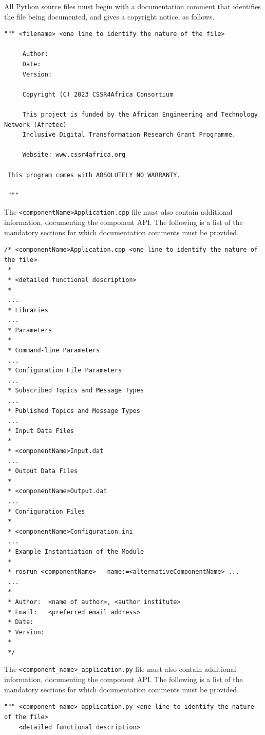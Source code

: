\documentclass{CSSRforAfrica}
\newcommand{\blank}{~\\}
\begin{document}
\begin{appendices}
\newpage
\noindent All Python source files must begin with a documentation comment that identifies the file being documented, and gives a copyright notice, as follows.  
{\small
\begin{verbatim}
""" <filename> <one line to identify the nature of the file>
 
     Author:
     Date:
     Version:
 
     Copyright (C) 2023 CSSR4Africa Consortium
 
     This project is funded by the African Engineering and Technology Network (Afretec) 
     Inclusive Digital Transformation Research Grant Programme. 
  
     Website: www.cssr4africa.org
 
 This program comes with ABSOLUTELY NO WARRANTY.

 """
\end{verbatim}
}


\newpage 
\noindent The {\small \verb+<componentName>Application.cpp+} file must also contain additional information, documenting the component API. The following is a list of the mandatory sections for which documentation comments must be provided.  

{\small
\begin{verbatim}
/* <componentName>Application.cpp <one line to identify the nature of the file>
 *
 * <detailed functional description>
 *
 ...
 * Libraries
 ...
 * Parameters 
 *
 * Command-line Parameters
 ...
 * Configuration File Parameters
 ... 
 * Subscribed Topics and Message Types
 ...                     
 * Published Topics and Message Types
 ...
 * Input Data Files
 *
 * <componentName>Input.dat
 ...
 * Output Data Files
 *
 * <componentName>Output.dat
 ...
 * Configuration Files
 *
 * <componentName>Configuration.ini 
 ... 
 * Example Instantiation of the Module
 *
 * rosrun <componentName> __name:=<alternativeComponentName> ...
 ...
 * 
 * Author:  <name of author>, <author institute>
 * Email:   <preferred email address>
 * Date:
 * Version:
 *
 */
\end{verbatim}
}

\newpage
 
\noindent The {\small \verb+<component_name>_application.py+} file must also contain additional information, documenting the component API. The following is a list of the mandatory sections for which documentation comments must be provided.  
 
{\small
\begin{verbatim}
""" <component_name>_application.py <one line to identify the nature of the file>
    <detailed functional description>


\end{verbatim}}
\end{appendices}
\end{document}
